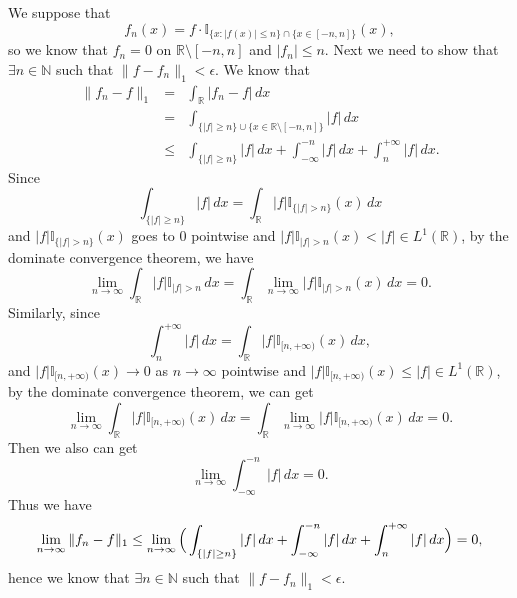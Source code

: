 \documentclass[12pt]{article}
\begin{document}
We suppose that
\begin{equation*}
    f_{n} (x) = f \cdot \mathbb{I}_{\{x: |f(x)| \leq n\} \cap \{x \in [-n, n]\}} (x),
\end{equation*}
so we know that $f_{n} = 0$ on $\mathbb{R} \setminus [-n, n]$ and $|f_{n}| \leq n$. Next we need to show that $\exists n \in \mathbb{N}$ such that $\|f - f_{n}\|_{1} < \epsilon$. We know that
\begin{eqnarray*}
    \|f_{n} - f\|_{1} &=& \int_{\mathbb{R}}^{} |f_{n} - f| \, d x \\
    &=& \int_{\{|f| \geq n\} \cup \{x \in \mathbb{R} \setminus [-n, n]\}}^{} |f| \, d x  \\
    & \leq &  \int_{\{|f| \geq n\}}^{} |f| \, d x + \int_{-\infty}^{-n} |f| \, d x + \int_{n}^{+\infty} |f| \, d x .
\end{eqnarray*}
Since 
\begin{equation*}
    \int_{\{|f| \geq n\}}^{} |f| \, d x = \int_{\mathbb{R}}^{} |f| \mathbb{I}_{\{|f|>n\}} (x) \, d x
\end{equation*}
and $|f| \mathbb{I}_{\{|f|>n\}} (x)$ goes to $0$ pointwise and $|f| \mathbb{I}_{|f|>n} (x) < |f| \in L^{1}(\mathbb{R})$, by the dominate convergence theorem, we have
\begin{equation*}
    \lim_{n \to \infty} \int_{\mathbb{R}}^{} |f| \mathbb{I}_{|f|>n} \, d x = \int_{\mathbb{R}}^{}  \lim_{n \to \infty} |f| \mathbb{I}_{|f|>n} (x) \, d x = 0.
\end{equation*}
Similarly, since 
\begin{equation*}
    \int_{n}^{+ \infty} |f| \, d x = \int_{\mathbb{R}}^{} |f| \mathbb{I}_{[n, +\infty)} (x) \, d x,
\end{equation*}
and $|f| \mathbb{I}_{[n, +\infty)} (x) \to 0$ as $n \to \infty$ pointwise and $|f| \mathbb{I}_{[n, +\infty)} (x) \leq |f| \in L^{1}(\mathbb{R})$, by the dominate convergence theorem, we can get
\begin{equation*}
  \lim_{n \to \infty} \int_{\mathbb{R}}^{} |f| \mathbb{I}_{[n, +\infty)} (x) \, d x = \int_{\mathbb{R}}^{}  \lim_{n \to \infty} |f| \mathbb{I}_{[n, +\infty)} (x) \, d x = 0.
\end{equation*}
Then we also can get
\begin{equation*}
    \lim_{n \to \infty} \int_{-\infty}^{-n} |f| \, d x = 0.
\end{equation*}
Thus we have
\begin{equation*}
    \lim_{n \to \infty} \|f_{n} - f\|_{1} \leq \lim_{n \to \infty} \Big{(} \int_{\{|f| \geq n\}}^{} |f| \, d x + \int_{-\infty}^{-n} |f| \, d x + \int_{n}^{+\infty} |f| \, d x \Big{)} = 0,
\end{equation*}
hence we know that $\exists n \in \mathbb{N}$ such that $\|f - f_{n}\|_{1} < \epsilon$.
\end{document}
